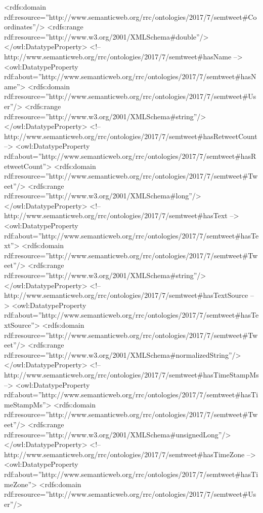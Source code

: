 \begin{listing}[
  language = XML,
  numbers=left,
  numberstyle=\tiny,
  stepnumber=5,
  numbersep=5pt,
  frame=single,
  caption  = {Ontología de tweets: Ontotwitter},
  label    = code:ontotwitter]
        <rdfs:domain
        rdf:resource=''http://www.semanticweb.org/rrc/ontologies/2017/7/semtweet#Coordinates''/>
        <rdfs:range rdf:resource=''http://www.w3.org/2001/XMLSchema#double''/>
    </owl:DatatypeProperty>
    <!-- http://www.semanticweb.org/rrc/ontologies/2017/7/semtweet#hasName -->
    <owl:DatatypeProperty
    rdf:about=''http://www.semanticweb.org/rrc/ontologies/2017/7/semtweet#hasName''>
        <rdfs:domain
        rdf:resource=''http://www.semanticweb.org/rrc/ontologies/2017/7/semtweet#User''/>
        <rdfs:range rdf:resource=''http://www.w3.org/2001/XMLSchema#string''/>
    </owl:DatatypeProperty>
    <!--
    http://www.semanticweb.org/rrc/ontologies/2017/7/semtweet#hasRetweetCount
    -->
    <owl:DatatypeProperty
    rdf:about=''http://www.semanticweb.org/rrc/ontologies/2017/7/semtweet#hasRetweetCount''>
        <rdfs:domain
        rdf:resource=''http://www.semanticweb.org/rrc/ontologies/2017/7/semtweet#Tweet''/>
        <rdfs:range rdf:resource=''http://www.w3.org/2001/XMLSchema#long''/>
    </owl:DatatypeProperty>
    <!-- http://www.semanticweb.org/rrc/ontologies/2017/7/semtweet#hasText -->
    <owl:DatatypeProperty
    rdf:about=''http://www.semanticweb.org/rrc/ontologies/2017/7/semtweet#hasText''>
        <rdfs:domain
        rdf:resource=''http://www.semanticweb.org/rrc/ontologies/2017/7/semtweet#Tweet''/>
        <rdfs:range rdf:resource=''http://www.w3.org/2001/XMLSchema#string''/>
    </owl:DatatypeProperty>
    <!-- http://www.semanticweb.org/rrc/ontologies/2017/7/semtweet#hasTextSource
    -->
    <owl:DatatypeProperty
    rdf:about=''http://www.semanticweb.org/rrc/ontologies/2017/7/semtweet#hasTextSource''>
        <rdfs:domain
        rdf:resource=''http://www.semanticweb.org/rrc/ontologies/2017/7/semtweet#Tweet''/>
        <rdfs:range
        rdf:resource=''http://www.w3.org/2001/XMLSchema#normalizedString''/>
    </owl:DatatypeProperty>
    <!--
    http://www.semanticweb.org/rrc/ontologies/2017/7/semtweet#hasTimeStampMs -->
    <owl:DatatypeProperty
    rdf:about=''http://www.semanticweb.org/rrc/ontologies/2017/7/semtweet#hasTimeStampMs''>
        <rdfs:domain
        rdf:resource=''http://www.semanticweb.org/rrc/ontologies/2017/7/semtweet#Tweet''/>
        <rdfs:range
        rdf:resource=''http://www.w3.org/2001/XMLSchema#unsignedLong''/>
    </owl:DatatypeProperty>
    <!-- http://www.semanticweb.org/rrc/ontologies/2017/7/semtweet#hasTimeZone
    -->
    <owl:DatatypeProperty
    rdf:about=''http://www.semanticweb.org/rrc/ontologies/2017/7/semtweet#hasTimeZone''>
        <rdfs:domain
        rdf:resource=''http://www.semanticweb.org/rrc/ontologies/2017/7/semtweet#User''/>

\end{listing}
